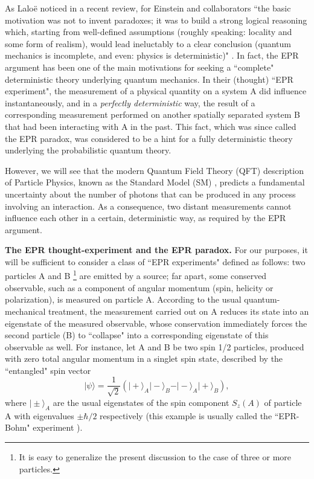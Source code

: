 \documentclass[aps,prl,showkeys,showpacs,preprint,groupedaddress,12pt]{revtex4}
\begin{document}
As Lalo\"e noticed in a recent review, for Einstein and
collaborators ``the basic motivation was not to invent paradoxes;
it was to build a strong logical reasoning which, starting from
well-defined assumptions (roughly speaking: locality and some form
of realism), would lead ineluctably to a clear conclusion (quantum
mechanics is incomplete, and even: physics is deterministic)"
\cite{Laloe}. In fact, the EPR argument has been one of the main
motivations for seeking a ``complete" deterministic theory
underlying quantum mechanics. In their (thought) ``EPR
experiment", the measurement of a physical quantity on a system A
did influence instantaneously, and in a {\it perfectly
deterministic} way, the result of a corresponding measurement
performed on another spatially separated system B that had been
interacting with A in the past. This fact, which was since called
the EPR paradox, was considered to be a hint for a fully
deterministic theory underlying the probabilistic quantum theory.

However, we will see that the modern Quantum Field Theory (QFT)
description of Particle Physics, known as the Standard Model (SM)
\cite{WeinbookI,WeinbookII}, predicts a fundamental uncertainty
about the number of photons that can be produced in any process
involving an interaction. As a consequence, two distant
measurements cannot influence each other in a certain,
deterministic way, as required by the EPR argument.

{\bf The EPR thought-experiment and the EPR paradox.} For our
purposes, it will be sufficient to consider a class of ``EPR
experiments" defined as follows: two particles A and B
\footnote{It is easy to generalize the present discussion to the
case of three or more particles.} are emitted by a source; far
apart, some conserved observable, such as a component of angular
momentum (spin, helicity or polarization), is measured on particle
A. According to the usual quantum-mechanical treatment, the
measurement carried out on A reduces its state into an eigenstate
of the measured observable, whose conservation immediately forces
the second particle (B) to ``collapse" into a corresponding
eigenstate of this observable as well. For instance, let A and B
be two spin 1/2 particles, produced with zero total angular
momentum in a singlet spin state, described by the ``entangled"
spin vector
\begin{equation}
\vert\psi\rangle=\frac{1}{\sqrt{2}}\left(\vert+\rangle_{A}\vert-\rangle_{B}
- \vert-\rangle_{A}\vert+\rangle_{B}\right), \label{entanglement}
\end{equation}
where $\vert\pm\rangle_A$ are the usual eigenstates of the spin
component $S_z(A)$ of particle A with eigenvalues $\pm\hbar/2$
respectively (this example is usually called the ``EPR-Bohm"
experiment \cite{Bohm,Laloe}).
\end{document}
